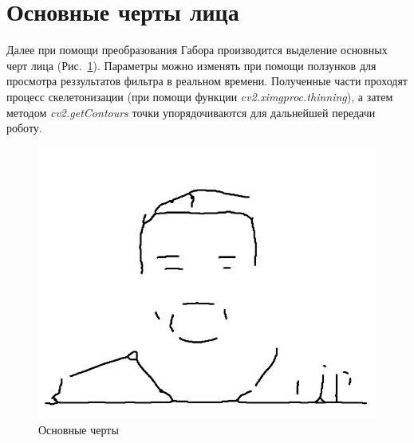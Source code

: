 \documentclass[a4paper, 11pt]{article}
\begin{document}
\section{Основные черты лица}
Далее при помощи преобразования Габора производится выделение основных черт лица (Рис.~\ref{gabor}). Параметры можно изменять при помощи ползунков для просмотра реззультатов фильтра в реальном времени. Полученные части проходят процесс скелетонизации (при помощи функции \textit{cv2.ximgproc.thinning}), а затем методом \textit{cv2.getContours} точки упорядочиваются для дальнейшей передачи роботу.

\begin{figure}[h!]
	\centering
	\includegraphics[width=0.5\linewidth]{"man_gabor.png"}
	\caption{Основные черты} \label{gabor}
\end{figure}
\end{document}
